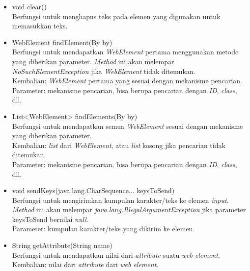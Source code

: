 \documentclass[a4paper,twoside]{article}
\begin{document}
\begin{enumerate}
\begin{itemize}
\item void clear()\\
Berfungsi untuk menghapus teks pada elemen yang digunakan untuk memasukkan teks.
\item WebElement findElement(By by)\\
Berfungsi untuk mendapatkan \textit{WebElement} pertama menggunakan metode yang diberikan parameter. \textit{Method} ini akan melempar \textit{NoSuchElementException} jika \textit{WebElement} tidak ditemukan.\\
Kembalian: \textit{WebElement} pertama yang sesuai dengan mekanisme pencarian.\\
Parameter: mekanisme pencarian, bisa berupa pencarian dengan \textit{ID}, \textit{class}, dll.

\item List<WebElement> findElements(By by)\\
Berfungsi untuk mendapatkan semua \textit{WebElement} sesuai dengan mekanisme yang diberikan parameter.\\
Kembalian: \textit{list} dari \textit{WebElement}, atau \textit{list} kosong jika pencarian tidak ditemukan.\\
Parameter: mekanisme pencarian, bisa berupa pencarian dengan \textit{ID}, \textit{class}, dll.
\item void sendKeys(java.lang.CharSequence... keysToSend)\\
Berfungsi untuk mengirimkan kumpulan karakter/teks ke elemen \textit{input}. \textit{Method} ini akan melempar \textit{java.lang.IllegalArgumentException} jika parameter keysToSend bernilai \textit{null}.\\
Parameter: kumpulan karakter/teks yang dikirim ke elemen.

\item String getAttribute(String name)\\
Berfungsi untuk mendapatkan nilai dari \textit{attribute} suatu \textit{web element}.\\
Kembalian: nilai dari \textit{attribute} dari \textit{web element}.
\end{itemize} 


\end{enumerate}
\end{document}
